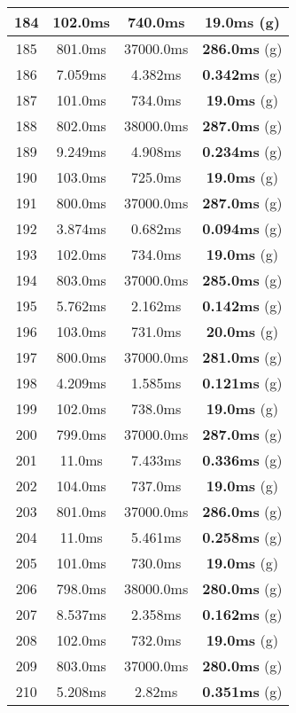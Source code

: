 \begin{table}[H]
\begin{minipage}{5cm}
{\begin{tabular}{|c|c|c|c|}
\hline
184 & 102.0ms & 740.0ms & \textbf{19.0ms} (g) \\
\hline
185 & 801.0ms & 37000.0ms & \textbf{286.0ms} (g) \\
\hline
186 & 7.059ms & 4.382ms & \textbf{0.342ms} (g) \\
\hline
187 & 101.0ms & 734.0ms & \textbf{19.0ms} (g) \\
\hline
188 & 802.0ms & 38000.0ms & \textbf{287.0ms} (g) \\
\hline
189 & 9.249ms & 4.908ms & \textbf{0.234ms} (g) \\
\hline
190 & 103.0ms & 725.0ms & \textbf{19.0ms} (g) \\
\hline
191 & 800.0ms & 37000.0ms & \textbf{287.0ms} (g) \\
\hline
192 & 3.874ms & 0.682ms & \textbf{0.094ms} (g) \\
\hline
193 & 102.0ms & 734.0ms & \textbf{19.0ms} (g) \\
\hline
194 & 803.0ms & 37000.0ms & \textbf{285.0ms} (g) \\
\hline
195 & 5.762ms & 2.162ms & \textbf{0.142ms} (g) \\
\hline
196 & 103.0ms & 731.0ms & \textbf{20.0ms} (g) \\
\hline
197 & 800.0ms & 37000.0ms & \textbf{281.0ms} (g) \\
\hline
198 & 4.209ms & 1.585ms & \textbf{0.121ms} (g) \\
\hline
199 & 102.0ms & 738.0ms & \textbf{19.0ms} (g) \\
\hline
200 & 799.0ms & 37000.0ms & \textbf{287.0ms} (g) \\
\hline
201 & 11.0ms & 7.433ms & \textbf{0.336ms} (g) \\
\hline
202 & 104.0ms & 737.0ms & \textbf{19.0ms} (g) \\
\hline
203 & 801.0ms & 37000.0ms & \textbf{286.0ms} (g) \\
\hline
204 & 11.0ms & 5.461ms & \textbf{0.258ms} (g) \\
\hline
205 & 101.0ms & 730.0ms & \textbf{19.0ms} (g) \\
\hline
206 & 798.0ms & 38000.0ms & \textbf{280.0ms} (g) \\
\hline
207 & 8.537ms & 2.358ms & \textbf{0.162ms} (g) \\
\hline
208 & 102.0ms & 732.0ms & \textbf{19.0ms} (g) \\
\hline
209 & 803.0ms & 37000.0ms & \textbf{280.0ms} (g) \\
\hline
210 & 5.208ms & 2.82ms & \textbf{0.351ms} (g) \\

\end{tabular}}
\end{minipage}
\end{table}
